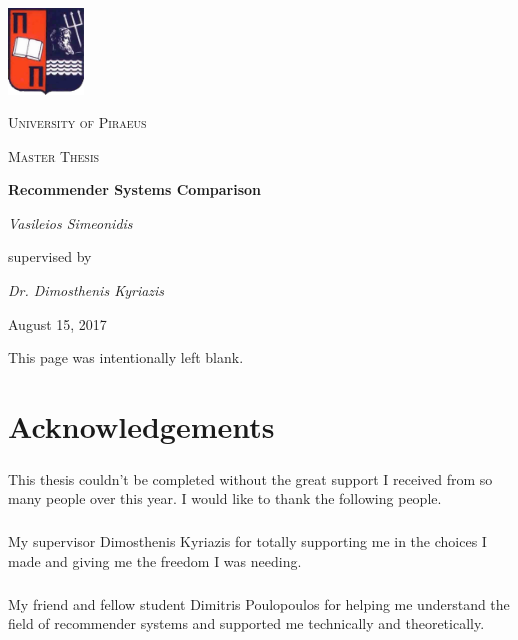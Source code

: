 \documentclass[12pt,a4paper]{book}
\begin{document}
	\begin{titlepage}
		\centering
		\includegraphics[width=0.15\textwidth]{images/UniversityOfPiraeusLogo.png}\par\vspace{1cm}
		{\scshape\LARGE University of Piraeus \par}
		\vspace{1cm}
		{\scshape\Large Master Thesis\par}
		\vspace{1.5cm}
		{\huge\bfseries Recommender Systems Comparison\par}
		\vspace{2cm}
		{\Large\itshape Vasileios Simeonidis\par}
		\vspace{6cm}
		supervised by\par
		\textit{Dr. Dimosthenis Kyriazis}
		\vfill
		{\large August 15, 2017\par}
	\end{titlepage}


\newpage
\tableofcontents
{}
\newpage
{}
\begin{center}
This page was intentionally left blank.
\end{center}
\newpage
\chapter*{Acknowledgements}

\paragraph{} This thesis couldn't be completed without the great support I received from so many people over this year. I would like to thank the following people.

\paragraph{} My supervisor Dimosthenis Kyriazis for totally supporting me in the choices I made and giving me the freedom I was needing.

\paragraph{} My friend and fellow student Dimitris Poulopoulos for helping me understand the field of recommender systems and supported me technically and theoretically.
\end{document}
